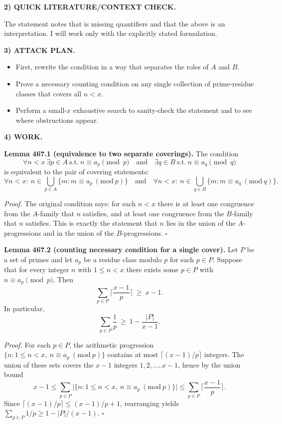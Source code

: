 \medskip
\noindent\textbf{2) QUICK LITERATURE/CONTEXT CHECK.}

The statement notes that \cite{ErGr80} is missing quantifiers and that the above is an interpretation. I will work only with the explicitly stated formulation.

\medskip
\noindent\textbf{3) ATTACK PLAN.}

\begin{itemize}
\item First, rewrite the condition in a way that separates the roles of $A$ and $B$.
\item Prove a necessary counting condition on any single collection of prime-residue classes that covers all $n<x$.
\item Perform a small-$x$ exhaustive search to sanity-check the statement and to see where obstructions appear.
\end{itemize}

\medskip
\noindent\textbf{4) WORK.}

\noindent\textbf{Lemma 467.1 (equivalence to two separate coverings).}
The condition
\[
\forall n<x\ \exists p\in A\ \text{s.t.}\ n\equiv a_p\pmod p\quad\text{and}\quad \exists q\in B\ \text{s.t.}\ n\equiv a_q\pmod q
\]
is equivalent to the pair of covering statements:
\[
\forall n<x:\ n\in \bigcup_{p\in A}\{m: m\equiv a_p\ (\mathrm{mod}\ p)\}\quad\text{and}\quad
\forall n<x:\ n\in \bigcup_{q\in B}\{m: m\equiv a_q\ (\mathrm{mod}\ q)\}.
\]

\textit{Proof.}
The original condition says: for each $n<x$ there is at least one congruence from the $A$-family that $n$ satisfies, and at least one congruence from the $B$-family that $n$ satisfies. This is exactly the statement that $n$ lies in the union of the $A$-progressions and in the union of the $B$-progressions. \hfill$\square$

\medskip
\noindent\textbf{Lemma 467.2 (counting necessary condition for a single cover).}
Let $P$ be a set of primes and let $a_p$ be a residue class modulo $p$ for each $p\in P$. Suppose that for every integer $n$ with $1\le n<x$ there exists some $p\in P$ with $n\equiv a_p\pmod p$. Then
\[
\sum_{p\in P}\Big\lceil\frac{x-1}{p}\Big\rceil\ \ge\ x-1.
\]
In particular,
\[
\sum_{p\in P}\frac{1}{p}\ \ge\ 1-\frac{|P|}{x-1}.
\]

\textit{Proof.}
For each $p\in P$, the arithmetic progression $\{n: 1\le n<x,\ n\equiv a_p\ (\mathrm{mod}\ p)\}$ contains at most $\lceil (x-1)/p\rceil$ integers. The union of these sets covers the $x-1$ integers $1,2,\dots,x-1$, hence by the union bound
\[
 x-1\le \sum_{p\in P}\Big|\{n:1\le n<x,\ n\equiv a_p\ (\mathrm{mod}\ p)\}\Big|\le \sum_{p\in P}\Big\lceil\frac{x-1}{p}\Big\rceil.
\]
Since $\lceil (x-1)/p\rceil\le (x-1)/p+1$, rearranging yields $\sum_{p\in P} 1/p\ge 1-|P|/(x-1)$. \hfill$\square$

